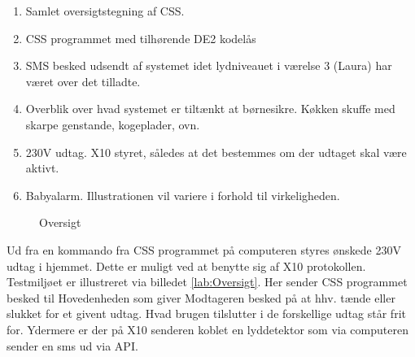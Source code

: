 \begin{enumerate}
\item Samlet oversigtstegning af CSS. 
\item CSS programmet med tilhørende DE2 kodelås
\item SMS besked udsendt af systemet idet lydniveauet i værelse 3 (Laura) har været over det tilladte.
\item Overblik over hvad systemet er tiltænkt at børnesikre. Køkken skuffe med skarpe genstande, kogeplader, ovn.
\item 230V udtag. X10 styret, således at det bestemmes om der udtaget skal være aktivt.
\item Babyalarm. Illustrationen vil variere i forhold til virkeligheden.
\end{enumerate}

\begin{figure}[h] \centering
{}
\caption{Oversigt}
\label{fig:Oversigt}
\end{figure}


Ud fra en kommando fra CSS programmet på computeren styres ønskede 230V udtag i hjemmet. Dette er muligt ved at benytte sig af X10 protokollen. Testmiljøet er illustreret via billedet \ref{lab:Oversigt}. Her sender CSS programmet besked til Hovedenheden som giver Modtageren besked på at hhv. tænde eller slukket for et givent udtag. Hvad brugen tilslutter i de forskellige udtag står frit for. Ydermere er der på X10 senderen koblet en lyddetektor som via computeren sender en sms ud via API.